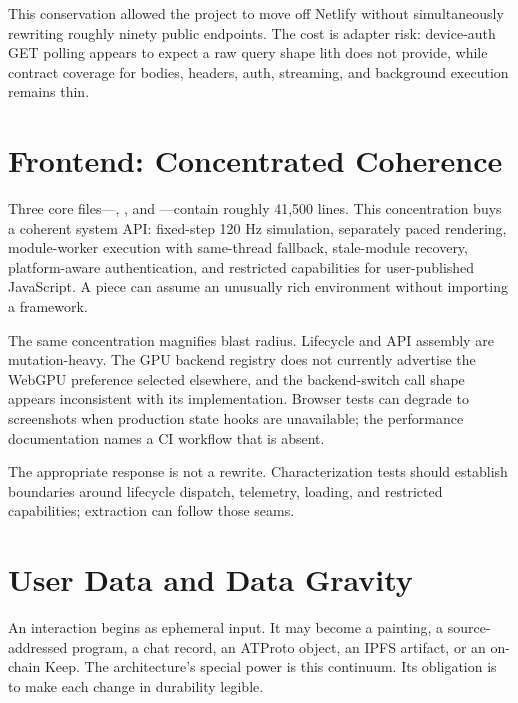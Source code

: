 \documentclass[10pt,letterpaper,twocolumn]{article}
\begin{document}
This conservation allowed the project to move off Netlify without simultaneously rewriting roughly ninety public endpoints. The cost is adapter risk: device-auth GET polling appears to expect a raw query shape lith does not provide, while contract coverage for bodies, headers, auth, streaming, and background execution remains thin.


\section{Frontend: Concentrated Coherence}

Three core files---, , and ---contain roughly 41,500 lines. This concentration buys a coherent system API: fixed-step 120 Hz simulation, separately paced rendering, module-worker execution with same-thread fallback, stale-module recovery, platform-aware authentication, and restricted capabilities for user-published JavaScript. A piece can assume an unusually rich environment without importing a framework.

The same concentration magnifies blast radius. Lifecycle and API assembly are mutation-heavy. The GPU backend registry does not currently advertise the WebGPU preference selected elsewhere, and the backend-switch call shape appears inconsistent with its implementation. Browser tests can degrade to screenshots when production state hooks are unavailable; the performance documentation names a CI workflow that is absent.

The appropriate response is not a rewrite. Characterization tests should establish boundaries around lifecycle dispatch, telemetry, loading, and restricted capabilities; extraction can follow those seams.

\section{User Data and Data Gravity}

An interaction begins as ephemeral input. It may become a painting, a source-addressed program, a chat record, an ATProto object, an IPFS artifact, or an on-chain Keep. The architecture's special power is this continuum. Its obligation is to make each change in durability legible.
\end{document}
